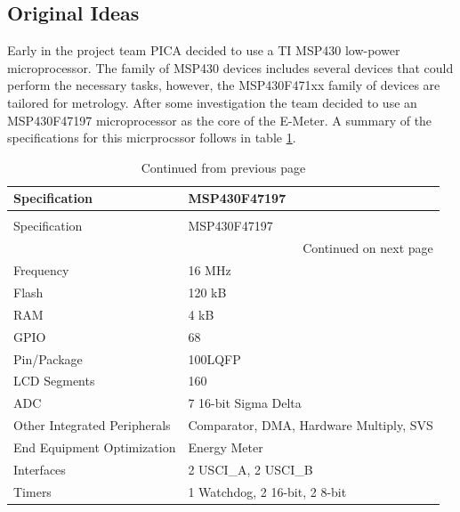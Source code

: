 \subsection{Original Ideas}
Early in the project team PICA decided to use a \ac{TI} MSP430 low-power microprocessor. The family of MSP430 devices includes several devices that could perform the necessary tasks, however, the MSP430F471xx family of devices are tailored for metrology. After some investigation the team decided to use an MSP430F47197 microprocessor as the core of the E-Meter. A summary of the specifications for this micrprocssor follows in table \ref{tab:msp430f47197_specs}.
{
\begin{longtable}[c]{|l|l|}
\caption{Specifications for the MSP430F47197\cite{slas626c}\label{tab:msp430f47197_specs}}\\
\hline
\rowcolor{lightgray}
Specification & MSP430F47197\\\hline
\endfirsthead
\caption[]{Continued from previous page}\\

\hline
\rowcolor{lightgray}
Specification & MSP430F47197\\\hline
\endhead
\multicolumn{2}{r}{{Continued on next page}}\\
\endfoot

\endlastfoot

Frequency                    & 16 MHz\\\hline
Flash                        & 120 kB\\\hline
RAM                          & 4 kB\\\hline
GPIO                         & 68\\\hline
Pin/Package                  & 100LQFP\\\hline
LCD Segments                 & 160\\\hline
ADC                          & 7 16-bit Sigma Delta\\\hline
Other Integrated Peripherals & Comparator, DMA, Hardware Multiply, SVS\\\hline
End Equipment Optimization   & Energy Meter\\\hline
Interfaces                   & 2 USCI\_A, 2 USCI\_B\\\hline
Timers                       & 1 Watchdog, 2 16-bit, 2 8-bit\\\hline
\end{longtable}
}
